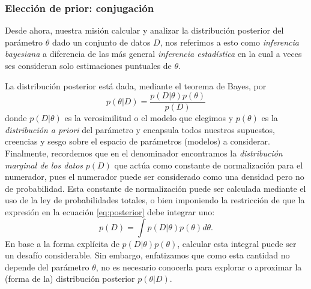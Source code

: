\subsubsection{Elección de prior: conjugación}
\label{ssub:reg_lin_bayes}

Desde ahora, nuestra misión calcular y analizar la distribución posterior del parámetro $\theta$ dado un conjunto de datos $D$, nos referimos a esto como \emph{inferencia bayesiana} a diferencia de las más general \emph{inferencia estadística} en la cual a veces ses consideran solo estimaciones puntuales de $\theta$. 

La distribución posterior está dada, mediante el teorema de Bayes, por
\begin{equation}
	p(\theta|D)=\frac{p(D|\theta)p(\theta)}{p(D)}
	\label{eq:posterior}
\end{equation}
donde $p(D|\theta)$ es la verosimilitud o el modelo que elegimos y $p(\theta)$ es la \emph{distribución a priori} del parámetro y encapsula todos nuestros supuestos, creencias y sesgo sobre el espacio de parámetros (modelos) a considerar. Finalmente, recordemos que en el denominador encontramos la  \emph{distribución marginal de los datos} $p(D)$ que actúa como constante de normalización para el numerador, pues el numerador puede ser considerado como una densidad pero no de probabilidad. Esta constante de normalización puede ser calculada mediante el uso de la ley de probabilidades totales, o bien imponiendo la restricción de que la expresión en la ecuación \eqref{eq:posterior} debe integrar uno:
\begin{equation}
	p(D) = \int p(D|\theta)p(\theta)d\theta.
\end{equation}
En base a la forma explícita de $p(D|\theta)p(\theta)$, calcular esta integral puede ser un desafío considerable. Sin embargo, enfatizamos que como esta cantidad no depende del parámetro $\theta$, no es necesario conocerla para explorar o aproximar la (forma de la) distribución posterior $p(\theta|D)$. 

